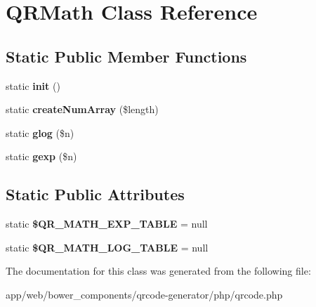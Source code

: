 \hypertarget{class_q_r_math}{}\section{Q\+R\+Math Class Reference}
\label{class_q_r_math}
\subsection*{Static Public Member Functions}
\begin{DoxyCompactItemize}
\item 
\mbox{\label{class_q_r_math_a9f8f007631843eecebb56cfb5786ecfd}} 
static {\bfseries init} ()
\item 
\mbox{\label{class_q_r_math_a030a2f9a578eba6350e1c6be3e2a6594}} 
static {\bfseries create\+Num\+Array} (\$length)
\item 
\mbox{\label{class_q_r_math_a5f779a3d7f7f5734de5dfe6339638ca7}} 
static {\bfseries glog} (\$n)
\item 
\mbox{\label{class_q_r_math_a7fcd63f4fe396eb4d18551c1ab1af17c}} 
static {\bfseries gexp} (\$n)
\end{DoxyCompactItemize}
\subsection*{Static Public Attributes}
\begin{DoxyCompactItemize}
\item 
\mbox{\label{class_q_r_math_a0b904fec4acb8fd3b67b095e9b189c35}} 
static {\bfseries \$\+Q\+R\+\_\+\+M\+A\+T\+H\+\_\+\+E\+X\+P\+\_\+\+T\+A\+B\+LE} = null
\item 
\mbox{\label{class_q_r_math_a449228c280e27780cdaad1c37ff9f301}} 
static {\bfseries \$\+Q\+R\+\_\+\+M\+A\+T\+H\+\_\+\+L\+O\+G\+\_\+\+T\+A\+B\+LE} = null
\end{DoxyCompactItemize}


The documentation for this class was generated from the following file\+:\begin{DoxyCompactItemize}
\item 
app/web/bower\+\_\+components/qrcode-\/generator/php/qrcode.\+php\end{DoxyCompactItemize}
